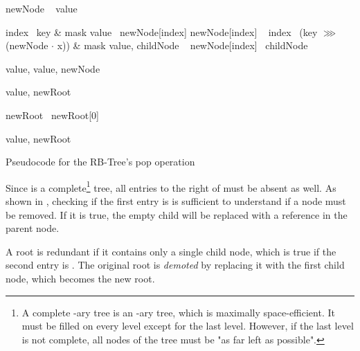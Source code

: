 \begin{listing}[ht!]

    \begin{algorithmic}[1]
            \State newNode \la\ 
            \State value \la\ \nil{}

                \State index \la\ key \& mask
                \State value \la\ newNode[index]
                \State newNode[index] \la\ \nil{}
            \Else
                \State index \la\ (key $\ggg$ (newNode $\cdot$ x)) \& mask
                \State value, childNode \la\ 
                \State newNode[index] \la\ childNode
            \EndIf

                \State \Return value, \nil{}
            \Else
                \State \Return value, newNode
            \EndIf
        \EndFunction

        \State

            \State value, newRoot \la\ 

                \State newRoot \la\ newRoot[0]
            \EndIf

            \State \Return value, newRoot
        \EndFunction
    \end{algorithmic}

    \caption{Pseudocode for the RB-Tree's pop operation}
    \label{lst:rb-tree-pop}
\end{listing}

Since \treerb{} is a complete\footnote{A complete \m{}-ary tree is an \m{}-ary tree, which is maximally space-efficient. It must be filled on every level except for the last level. However, if the last level is not complete, all nodes of the tree must be "as far left as possible".} tree, all entries to the right of \nil{} must be absent as well. As shown in , checking if the first entry is \nil{} is sufficient to understand if a node must be removed. If it is true, the empty child will be replaced with a \nil{} reference in the parent node.

A root is redundant if it contains only a single child node, which is true if the second entry is \nil{}.  The original root is \emph{demoted} by replacing it with the first child node, which becomes the new root.

